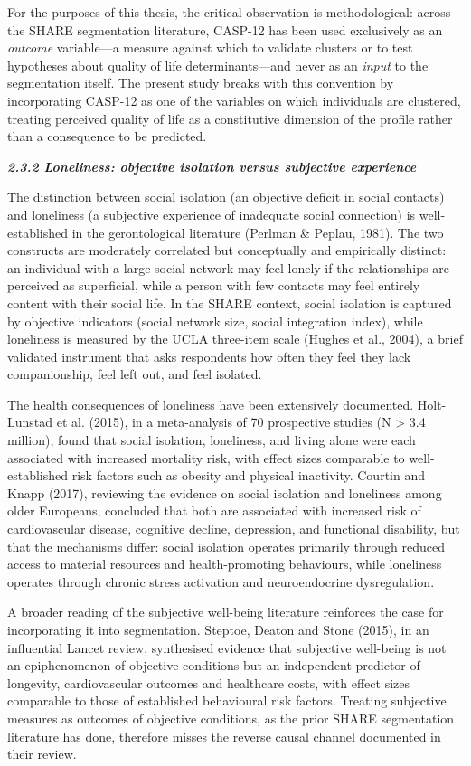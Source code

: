 For the purposes of this thesis, the critical observation is methodological: across the SHARE segmentation literature, CASP-12 has been used exclusively as an \emph{outcome} variable---a measure against which to validate clusters or to test hypotheses about quality of life determinants---and never as an \emph{input} to the segmentation itself. The present study breaks with this convention by incorporating CASP-12 as one of the variables on which individuals are clustered, treating perceived quality of life as a constitutive dimension of the profile rather than a consequence to be predicted.

\emph{\textbf{2.3.2 Loneliness: objective isolation versus subjective experience}}

The distinction between social isolation (an objective deficit in social contacts) and loneliness (a subjective experience of inadequate social connection) is well-established in the gerontological literature (Perlman \& Peplau, 1981). The two constructs are moderately correlated but conceptually and empirically distinct: an individual with a large social network may feel lonely if the relationships are perceived as superficial, while a person with few contacts may feel entirely content with their social life. In the SHARE context, social isolation is captured by objective indicators (social network size, social integration index), while loneliness is measured by the UCLA three-item scale (Hughes et al., 2004), a brief validated instrument that asks respondents how often they feel they lack companionship, feel left out, and feel isolated.

The health consequences of loneliness have been extensively documented. Holt-Lunstad et al. (2015), in a meta-analysis of 70 prospective studies (N \textgreater{} 3.4 million), found that social isolation, loneliness, and living alone were each associated with increased mortality risk, with effect sizes comparable to well-established risk factors such as obesity and physical inactivity. Courtin and Knapp (2017), reviewing the evidence on social isolation and loneliness among older Europeans, concluded that both are associated with increased risk of cardiovascular disease, cognitive decline, depression, and functional disability, but that the mechanisms differ: social isolation operates primarily through reduced access to material resources and health-promoting behaviours, while loneliness operates through chronic stress activation and neuroendocrine dysregulation.

A broader reading of the subjective well-being literature reinforces the case for incorporating it into segmentation. Steptoe, Deaton and Stone (2015), in an influential Lancet review, synthesised evidence that subjective well-being is not an epiphenomenon of objective conditions but an independent predictor of longevity, cardiovascular outcomes and healthcare costs, with effect sizes comparable to those of established behavioural risk factors. Treating subjective measures as outcomes of objective conditions, as the prior SHARE segmentation literature has done, therefore misses the reverse causal channel documented in their review.


